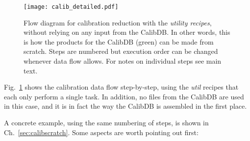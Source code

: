 \begin{figure}[!tb]
    \begin{center}
        \texttt{[image: calib\_detailed.pdf]}
    \end{center}
    \caption{
        \label{fig:calibflow_detailed}
        Flow diagram for calibration reduction with the \textit{utility
            recipes}, without relying on any input from the CalibDB. In other
            words, this is how the products for the CalibDB (green) can be made
            from scratch. Steps are numbered but execution order can be changed
            whenever data flow allows. For notes on individual steps see main
            text.}
\end{figure}

Fig.~\ref{fig:calibflow_detailed} shows the calibration data flow step-by-step,
using the \emph{util} recipes that each only perform a single task. In addition,
no files from the CalibDB are used in this case, and it is in fact the way the
CalibDB is assembled in the first place.

A concrete example, using the same numbering of steps, is shown in
Ch.~\ref{sec:calibscratch}. Some aspects are worth pointing out first:


